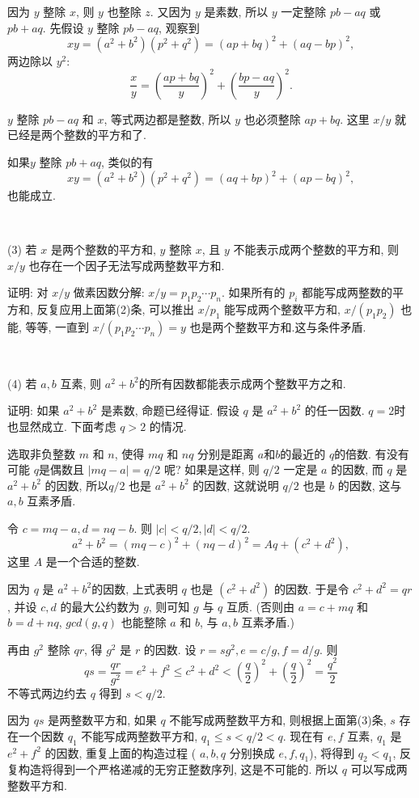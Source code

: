 因为 $ y $ 整除 $ x $, 则 $ y $ 也整除 $ z $. 又因为 $ y $ 是素数, 所以 $ y $ 一定整除 $ pb-aq $ 或 $ pb + aq $. 先假设 $ y $ 整除 $ pb-aq $, 观察到
\[ xy = (a^2+b^2)(p^2+q^2)=(ap+bq)^2+(aq-bp)^2 ,\]
两边除以 $ y^2 $:
\[ \frac{x}{y} = \left(\frac{ap+bq}{y}\right)^2+\left(\frac{bp-aq}{y}\right)^2 .\]

$ y $ 整除 $ pb-aq $ 和 $ x $, 等式两边都是整数, 所以 $ y $ 也必须整除 $ ap+bq $. 这里 $ x/y $ 就已经是两个整数的平方和了.

如果$ y $ 整除 $ pb+aq $, 类似的有
\[ xy = (a^2+b^2)(p^2+q^2)=(aq+bp)^2+(ap-bq)^2 ,\]
也能成立.

~

\noindent (3) 若 $ x $ 是两个整数的平方和, $ y $ 整除 $ x $, 且 $ y $ 不能表示成两个整数的平方和, 则 $ x/y $ 也存在一个因子无法写成两整数平方和.

证明: 对 $ x/y $ 做素因数分解: $ x/y=p_1p_2\cdots p_n $. 如果所有的 $p_i$ 都能写成两整数的平方和, 反复应用上面第(2)条, 可以推出 $ x/p_1 $ 能写成两个整数平方和, $ x/(p_1p_2) $ 也能, 等等, 一直到 $ x/(p_1p_2\cdots p_n)=y $ 也是两个整数平方和.这与条件矛盾.

~

\noindent (4) 若 $ a,b $ 互素, 则 $ a^2+b^2 $的所有因数都能表示成两个整数平方之和.

证明: 如果 $ a^2 + b^2 $ 是素数, 命题已经得证. 假设 $ q $ 是 $ a^2+b^2 $ 的任一因数. $q=2$时也显然成立. 下面考虑 $ q > 2 $ 的情况.

选取非负整数 $ m $ 和 $ n $, 使得 $mq$ 和 $nq$ 分别是距离 $a$和$b$的最近的 $q$的倍数. 有没有可能 $q$是偶数且 $|mq-a| = q/2 $ 呢? 如果是这样, 则 $q/2$ 一定是 $ a $ 的因数, 而 $ q $ 是 $a^2+b^2$ 的因数, 所以$ q/2 $ 也是 $a^2+b^2$ 的因数, 这就说明 $q/2$ 也是 $b$ 的因数, 这与 $ a,b $ 互素矛盾.

令 $ c=mq-a, d=nq-b$. 则 $ |c| < q/2, |d| < q/2 $. 
\[ a^2 + b^2 = (mq-c)^2+(nq-d)^2 = Aq+(c^2+d^2) ,\]
这里 $ A $ 是一个合适的整数.

因为 $q$ 是 $a^2+b^2$的因数, 上式表明 $q$ 也是 $ ( c^2 + d^2 ) $ 的因数. 于是令 $ c^2 + d^2 = qr $, 并设 $ c,d $ 的最大公约数为 $ g $, 则可知 $ g $ 与 $ q $ 互质. (否则由 $ a=c+mq $ 和 $ b=d+nq $, $gcd(g,q)$ 也能整除 $a$ 和 $b$, 与 $a,b$ 互素矛盾.)

再由 $ g^2 $ 整除 $ qr $, 得 $ g^2 $ 是 $ r $ 的因数. 设 $ r = sg^2, e=c/g, f=d/g $. 则
\[ qs = \frac{qr}{g^2}=e^2+f^2\leq c^2+d^2 < (\frac{q}{2})^2 + (\frac{q}{2})^2 = \frac{q^2}{2} \] 
不等式两边约去 $ q $ 得到 $ s < q/2 $. 

因为 $ qs $ 是两整数平方和, 如果 $ q $ 不能写成两整数平方和, 则根据上面第(3)条, $ s $ 存在一个因数 $ q_1 $ 不能写成两整数平方和, $ q_1 \leq s < q/2 < q $. 现在有 $ e,f $ 互素, $ q_1 $ 是 $ e^2+f^2 $ 的因数, 重复上面的构造过程 ( $a,b,q$ 分别换成 $e,f,q_1$), 将得到 $q_2 < q_1$, 反复构造将得到一个严格递减的无穷正整数序列, 这是不可能的. 所以 $ q $ 可以写成两整数平方和.

